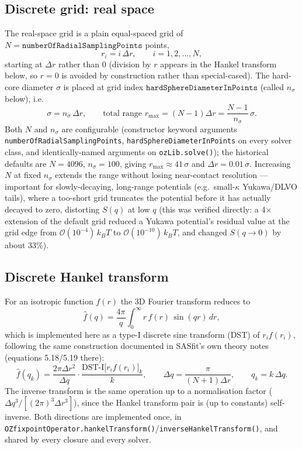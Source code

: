 \documentclass[11pt,a4paper]{article}
\newcommand{\code}[1]{\texttt{#1}}
\begin{document}
\subsection{Discrete grid: real space}

The real-space grid is a plain equal-spaced grid of $N=\code{numberOfRadialSamplingPoints}$
points,
\begin{equation}
  r_i = i\,\Delta r, \qquad i=1,2,\dots,N,
\end{equation}
starting at $\Delta r$ rather than $0$ (division by $r$ appears in the Hankel
transform below, so $r=0$ is avoided by construction rather than special-cased).
The hard-core diameter $\sigma$ is placed at grid index
$\code{hardSphereDiameterInPoints}$ (called $n_\sigma$ below), i.e.
\begin{equation}
  \sigma = n_\sigma\,\Delta r, \qquad
  \text{total range } r_{\max} = (N-1)\Delta r = \frac{N-1}{n_\sigma}\,\sigma.
\end{equation}
Both $N$ and $n_\sigma$ are configurable (constructor keyword arguments
\code{numberOfRadialSamplingPoints}, \code{hardSphereDiameterInPoints} on every
solver class, and identically-named arguments on \code{ozLib.solve()}); the
historical defaults are $N=4096$, $n_\sigma=100$, giving $r_{\max}\approx
41\,\sigma$ and $\Delta r = 0.01\,\sigma$. Increasing $N$ at fixed $n_\sigma$
extends the range without losing near-contact resolution --- important for
slowly-decaying, long-range potentials (e.g.\ small-$\kappa$ Yukawa/DLVO tails),
where a too-short grid truncates the potential before it has actually decayed
to zero, distorting $S(q)$ at low $q$ (this was verified directly: a 4$\times$
extension of the default grid reduced a Yukawa potential's residual value at
the grid edge from $\mathcal{O}(10^{-4})\,k_BT$ to $\mathcal{O}(10^{-10})\,k_BT$,
and changed $S(q\!\to\!0)$ by about 33\%).

\subsection{Discrete Hankel transform}

For an isotropic function $f(r)$ the 3D Fourier transform reduces to
\begin{equation}
  \hat f(q) = \frac{4\pi}{q}\int_0^\infty r\,f(r)\,\sin(qr)\,dr,
\end{equation}
which is implemented here as a type-I discrete sine transform (DST) of
$r_i f(r_i)$, following the same construction documented in SASfit's own
theory notes (equations 5.18/5.19 there):
\begin{equation}
  \hat f(q_k) = \frac{2\pi \Delta r^2}{\Delta q}\cdot
                \frac{\mathrm{DST\text{-}I}\big[r_i f(r_i)\big]_k}{k},
  \qquad
  \Delta q = \frac{\pi}{(N+1)\Delta r},
  \qquad q_k = k\,\Delta q.
\end{equation}
The inverse transform is the same operation up to a normalisation factor
($\Delta q^3/[(2\pi)^3\Delta r^3]$), since the Hankel transform pair is (up to
constants) self-inverse. Both directions are implemented once, in
\code{OZfixpointOperator.hankelTransform()}/\code{inverseHankelTransform()},
and shared by every closure and every solver.
\end{document}
